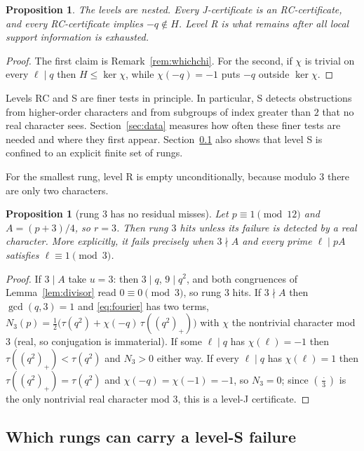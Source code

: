 \documentclass[11pt]{article}
\newtheorem{proposition}[theorem]{Proposition}
\theoremstyle{definition}
\theoremstyle{remark}
\newcommand{\jac}[2]{\left(\tfrac{#1}{#2}\right)}
\begin{document}
\begin{proposition}\label{prop:nested}
The levels are nested. Every J-certificate is an RC-certificate, and every
RC-certificate implies $-q \notin H$. Level R is what remains after all local support
information is exhausted.
\end{proposition}

\begin{proof}
The first claim is Remark~\ref{rem:whichchi}. For the second, if $\chi$ is trivial on
every $\ell \mid q$ then $H \le \ker\chi$, while $\chi(-q) = -1$ puts $-q$ outside
$\ker\chi$.
\end{proof}

Levels RC and S are finer tests in principle. In particular, S detects obstructions
from higher-order characters and from subgroups of index greater than $2$ that no real
character sees. Section~\ref{sec:data} measures how often these finer tests are needed
and where they first appear. Section~\ref{sec:whyS} also shows that level S is confined
to an explicit finite set of rungs.

For the smallest rung, level R is empty unconditionally, because modulo $3$ there are
only two characters.

\begin{proposition}[rung 3 has no residual misses]\label{prop:rung3}
Let $p \equiv 1 \pmod{12}$ and $A = (p+3)/4$, so $r = 3$. Then rung $3$ hits unless
its failure is detected by a real character. More explicitly, it fails precisely when $3 \nmid A$
and every prime $\ell \mid pA$ satisfies $\ell \equiv 1 \pmod 3$.
\end{proposition}

\begin{proof}
If $3 \mid A$ take $u = 3$: then $3 \mid q$, $9 \mid q^2$, and both congruences of
Lemma~\ref{lem:divisor} read $0 \equiv 0 \pmod 3$, so rung $3$ hits. If $3 \nmid A$
then $\gcd(q,3) = 1$ and \eqref{eq:fourier} has two terms,
$N_3(p) = \tfrac12\bigl(\tau(q^2) + \chi(-q)\,\tau((q^2)_+)\bigr)$ with $\chi$ the
nontrivial character mod $3$ (real, so conjugation is immaterial). If some $\ell \mid q$
has $\chi(\ell) = -1$ then $\tau((q^2)_+) < \tau(q^2)$ and $N_3 > 0$ either way. If
every $\ell \mid q$ has $\chi(\ell) = 1$ then $\tau((q^2)_+) = \tau(q^2)$ and
$\chi(-q) = \chi(-1) = -1$, so $N_3 = 0$; since $\jac{\cdot}{3}$ is the only nontrivial
real character mod $3$, this is a level-J certificate.
\end{proof}

\subsection{Which rungs can carry a level-S failure}\label{sec:whyS}
\end{document}
